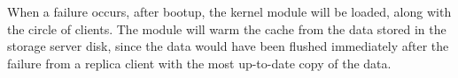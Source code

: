 When a failure occurs, after bootup, the kernel module
will be loaded, along with the circle of clients. The module
will warm the cache from the data stored in the storage server
disk, since the data would have
been flushed immediately after the failure from a replica client
with the most up-to-date copy of the data.

